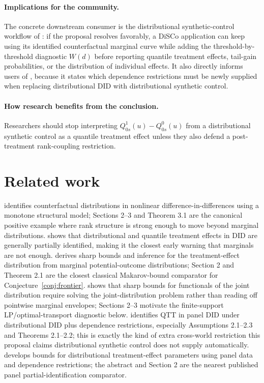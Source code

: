 \documentclass[11pt]{article}
\theoremstyle{definition}
\theoremstyle{plain}
\theoremstyle{remark}
\begin{document}
\paragraph{Implications for the community.}
The concrete downstream consumer is the distributional synthetic-control workflow of \cite{Gunsilius2023DiSCo}: if the proposal resolves favorably, a DiSCo application can keep using its identified counterfactual marginal curve while adding the threshold-by-threshold diagnostic \(W(d)\) before reporting quantile treatment effects, tail-gain probabilities, or the distribution of individual effects.  It also directly informs users of \cite{CallawayLi2019QTEDID}, because it states which dependence restrictions must be newly supplied when replacing distributional DID with distributional synthetic control.

\paragraph{How research benefits from the conclusion.}
Researchers should stop interpreting \(Q^1_{0s}(u)-Q^0_{0s}(u)\) from a distributional synthetic control as a quantile treatment effect unless they also defend a post-treatment rank-coupling restriction.

\section{Related work}
\cite{AtheyImbens2006CIC} identifies counterfactual distributions in nonlinear difference-in-differences using a monotone structural model; Sections 2--3 and Theorem 3.1 are the canonical positive example where rank structure is strong enough to move beyond marginal distributions.  \cite{FanYu2012PartialDID} shows that distributional and quantile treatment effects in DID are generally partially identified, making it the closest early warning that marginals are not enough.  \cite{FanPark2010SharpBounds} derives sharp bounds and inference for the treatment-effect distribution from marginal potential-outcome distributions; Section 2 and Theorem 2.1 are the closest classical Makarov-bound comparator for Conjecture~\ref{conj:frontier}.  \cite{FirpoRidder2019Functionals} shows that sharp bounds for functionals of the joint distribution require solving the joint-distribution problem rather than reading off pointwise marginal envelopes; Sections 2--3 motivate the finite-support LP/optimal-transport diagnostic below.  \cite{CallawayLi2019QTEDID} identifies QTT in panel DID under distributional DID plus dependence restrictions, especially Assumptions 2.1--2.3 and Theorems 2.1--2.2; this is exactly the kind of extra cross-world restriction this proposal claims distributional synthetic control does not supply automatically.  \cite{Callaway2021BoundsDTEPanel} develops bounds for distributional treatment-effect parameters using panel data and dependence restrictions; the abstract and Section 2 are the nearest published panel partial-identification comparator.
\end{document}
